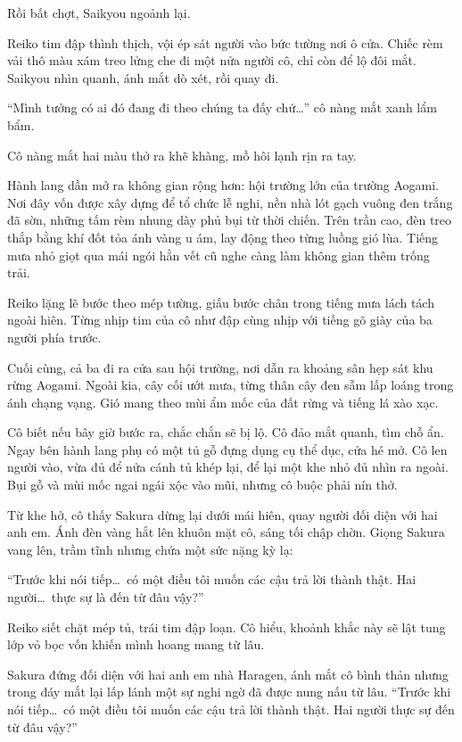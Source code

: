 \documentclass[../main.tex]{subfiles}
\begin{document}
Rồi bất chợt, Saikyou ngoảnh lại.

Reiko tim đập thình thịch, vội ép sát người vào bức tường nơi ô cửa. Chiếc rèm vải thô màu xám treo lửng che đi một nửa người cô, chỉ còn để lộ đôi mắt. Saikyou nhìn quanh, ánh mắt dò xét, rồi quay đi.

``Mình tưởng có ai đó đang đi theo chúng ta đấy chứ\dots'' cô nàng mắt xanh lẩm bẩm.

Cô nàng mắt hai màu thở ra khẽ khàng, mồ hôi lạnh rịn ra tay.

Hành lang dần mở ra không gian rộng hơn: hội trường lớn của trường Aogami. Nơi đây vốn được xây dựng để tổ chức lễ nghi, nền nhà lót gạch vuông đen trắng đã sờn, những tấm rèm nhung dày phủ bụi từ thời chiến. Trên trần cao, đèn treo thắp bằng khí đốt tỏa ánh vàng u ám, lay động theo từng luồng gió lùa. Tiếng mưa nhỏ giọt qua mái ngói hằn vết cũ nghe càng làm không gian thêm trống trải.

Reiko lặng lẽ bước theo mép tường, giấu bước chân trong tiếng mưa lách tách ngoài hiên. Từng nhịp tim của cô như đập cùng nhịp với tiếng gõ giày của ba người phía trước.

Cuối cùng, cả ba đi ra cửa sau hội trường, nơi dẫn ra khoảng sân hẹp sát khu rừng Aogami. Ngoài kia, cây cối ướt mưa, từng thân cây đen sẫm lấp loáng trong ánh chạng vạng. Gió mang theo mùi ẩm mốc của đất rừng và tiếng lá xào xạc.

Cô biết nếu bây giờ bước ra, chắc chắn sẽ bị lộ. Cô đảo mắt quanh, tìm chỗ ẩn. Ngay bên hành lang phụ có một tủ gỗ đựng dụng cụ thể dục, cửa hé mở. Cô len người vào, vừa đủ để nửa cánh tủ khép lại, để lại một khe nhỏ đủ nhìn ra ngoài. Bụi gỗ và mùi mốc ngai ngái xộc vào mũi, nhưng cô buộc phải nín thở.

Từ khe hở, cô thấy Sakura dừng lại dưới mái hiên, quay người đối diện với hai anh em. Ánh đèn vàng hắt lên khuôn mặt cô, sáng tối chập chờn. Giọng Sakura vang lên, trầm tĩnh nhưng chứa một sức nặng kỳ lạ:

``Trước khi nói tiếp\dots\ có một điều tôi muốn các cậu trả lời thành thật. Hai người\dots\ thực sự là đến từ đâu vậy?''

Reiko siết chặt mép tủ, trái tim đập loạn. Cô hiểu, khoảnh khắc này sẽ lật tung lớp vỏ bọc vốn khiến mình hoang mang từ lâu.

\ct

Sakura đứng đối diện với hai anh em nhà Haragen, ánh mắt cô bình thản nhưng trong đáy mắt lại lấp lánh một sự nghi ngờ đã được nung nấu từ lâu. ``Trước khi nói tiếp\dots\ có một điều tôi muốn các cậu trả lời thành thật. Hai người thực sự đến từ đâu vậy?''
\end{document}
